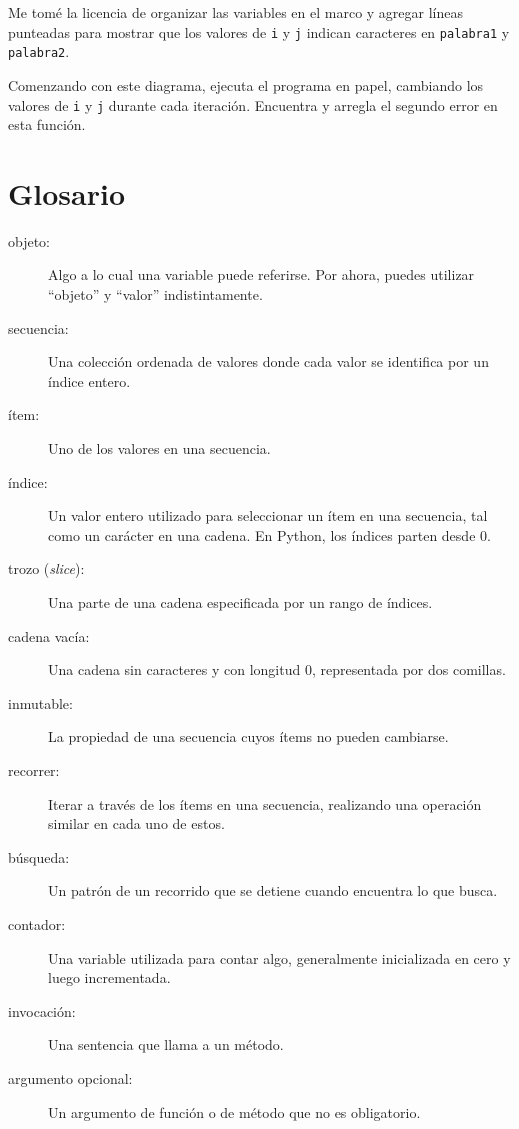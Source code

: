 \documentclass[10pt]{book}
\begin{document}
Me tomé la licencia de organizar las variables en el marco
y agregar líneas punteadas para mostrar que los valores de {\tt i} y
{\tt j} indican caracteres en {\tt palabra1} y {\tt palabra2}.

Comenzando con este diagrama, ejecuta el programa en papel, cambiando los
valores de {\tt i} y {\tt j} durante cada iteración.  Encuentra y arregla el
segundo error en esta función.
\label{isreverse}


\section{Glosario}

\begin{description}

\item[objeto:] Algo a lo cual una variable puede referirse.  Por ahora,
puedes utilizar ``objeto'' y ``valor'' indistintamente.

\item[secuencia:] Una colección ordenada de
valores donde cada valor se identifica por un índice entero.

\item[ítem:] Uno de los valores en una secuencia.

\item[índice:] Un valor entero utilizado para seleccionar un ítem en
una secuencia, tal como un carácter en una cadena.  En Python,
los índices parten desde 0.

\item[trozo ({\em slice}):] Una parte de una cadena especificada por un rango de índices.

\item[cadena vacía:] Una cadena sin caracteres y con longitud 0, representada
por dos comillas.

\item[inmutable:] La propiedad de una secuencia cuyos ítems no pueden
cambiarse.

\item[recorrer:] Iterar a través de los ítems en una secuencia,
realizando una operación similar en cada uno de estos.

\item[búsqueda:] Un patrón de un recorrido que se detiene
cuando encuentra lo que busca.

\item[contador:] Una variable utilizada para contar algo, generalmente inicializada
en cero y luego incrementada.

\item[invocación:] Una sentencia que llama a un método.

\item[argumento opcional:] Un argumento de función o de método que no es
obligatorio.

\end{description}
\end{document}
